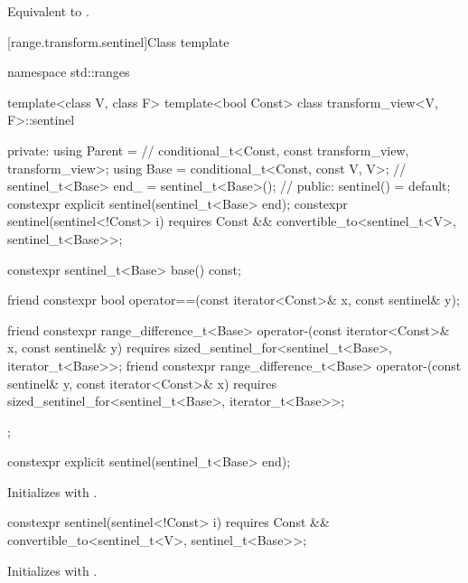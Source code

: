\begin{itemdescr}
\pnum
\effects Equivalent to .
\end{itemdescr}


[range.transform.sentinel]{Class template }

\begin{codeblock}
namespace std::ranges {
  template<class V, class F>
  template<bool Const>
  class transform_view<V, F>::sentinel {
  private:
    using Parent =                                      // \expos
      conditional_t<Const, const transform_view, transform_view>;
    using Base = conditional_t<Const, const V, V>;      // \expos
    sentinel_t<Base> end_ = sentinel_t<Base>();         // \expos
  public:
    sentinel() = default;
    constexpr explicit sentinel(sentinel_t<Base> end);
    constexpr sentinel(sentinel<!Const> i)
      requires Const && convertible_to<sentinel_t<V>, sentinel_t<Base>>;

    constexpr sentinel_t<Base> base() const;

    friend constexpr bool operator==(const iterator<Const>& x, const sentinel& y);

    friend constexpr range_difference_t<Base>
      operator-(const iterator<Const>& x, const sentinel& y)
        requires sized_sentinel_for<sentinel_t<Base>, iterator_t<Base>>;
    friend constexpr range_difference_t<Base>
      operator-(const sentinel& y, const iterator<Const>& x)
        requires sized_sentinel_for<sentinel_t<Base>, iterator_t<Base>>;
  };
}
\end{codeblock}

\begin{itemdecl}
constexpr explicit sentinel(sentinel_t<Base> end);
\end{itemdecl}

\begin{itemdescr}
\pnum
\effects Initializes  with .
\end{itemdescr}

\begin{itemdecl}
constexpr sentinel(sentinel<!Const> i)
  requires Const && convertible_to<sentinel_t<V>, sentinel_t<Base>>;
\end{itemdecl}

\begin{itemdescr}
\pnum
\effects Initializes  with .
\end{itemdescr}

